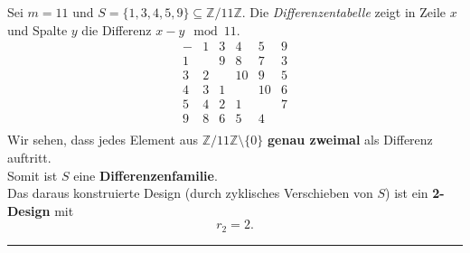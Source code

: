 \documentclass[9pt]{article}
\begin{document}
\begin{bsp}
Sei \( m = 11 \) und \( S = \{1, 3, 4, 5, 9\} \subseteq \mathbb{Z}/11\mathbb{Z} \). Die \emph{Differenzentabelle} zeigt in Zeile \( x \) und Spalte \( y \) die Differenz \( x - y \mod 11 \). 
\[
\begin{array}{c|ccccc}
- & 1 & 3 & 4 & 5 & 9 \\
\hline
1 &   & 9 & 8 & 7 & 3 \\
3 & 2 &   &10 & 9 & 5 \\
4 & 3 & 1 &   &10 & 6 \\
5 & 4 & 2 & 1 &   & 7 \\
9 & 8 & 6 & 5 & 4 &   \\
\end{array}
\]
Wir sehen, dass jedes Element aus \( \mathbb{Z}/11\mathbb{Z} \setminus \{0\} \) \textbf{genau zweimal} als Differenz auftritt. \\
Somit ist \( S \) eine \textbf{Differenzenfamilie}.\\
Das daraus konstruierte Design (durch zyklisches Verschieben von \( S \)) ist ein \textbf{2-Design} mit 
\[
r_2 = 2.
\]
\end{bsp} \noindent \rule{8cm}{0.4pt}
\end{document}
